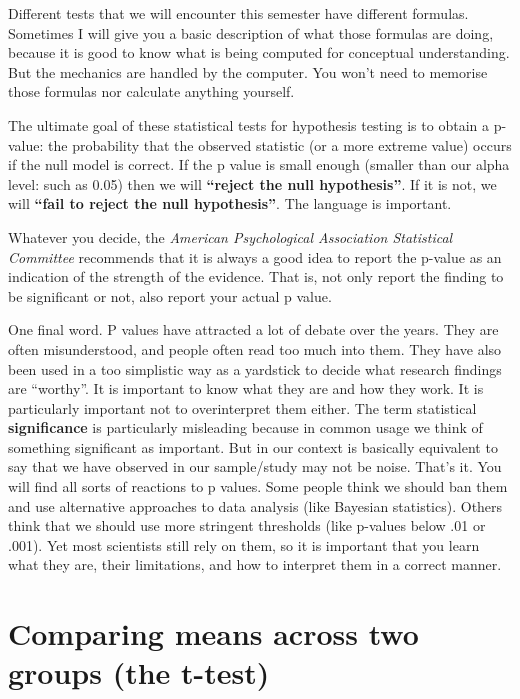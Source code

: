 \documentclass[
]{book}
\begin{document}
Different tests that we will encounter this semester have different formulas. Sometimes I will give you a basic description of what those formulas are doing, because it is good to know what is being computed for conceptual understanding. But the mechanics are handled by the computer. You won't need to memorise those formulas nor calculate anything yourself.

The ultimate goal of these statistical tests for hypothesis testing is to obtain a p-value: the probability that the observed statistic (or a more extreme value) occurs if the null model is correct. If the p value is small enough (smaller than our alpha level: such as 0.05) then we will \textbf{``reject the null hypothesis''}. If it is not, we will \textbf{``fail to reject the null hypothesis''}. The language is important.

Whatever you decide, the \emph{American Psychological Association Statistical Committee} recommends that it is always a good idea to report the p-value as an indication of the strength of the evidence. That is, not only report the finding to be significant or not, also report your actual p value.

One final word. P values have attracted a lot of debate over the years. They are often misunderstood, and people often read too much into them. They have also been used in a too simplistic way as a yardstick to decide what research findings are ``worthy''. It is important to know what they are and how they work. It is particularly important not to overinterpret them either. The term statistical \textbf{significance} is particularly misleading because in common usage we think of something significant as important. But in our context is basically equivalent to say that we have observed in our sample/study may not be noise. That's it. You will find all sorts of reactions to p values. Some people think we should ban them and use alternative approaches to data analysis (like Bayesian statistics). Others think that we should use more stringent thresholds (like p-values below .01 or .001). Yet most scientists still rely on them, so it is important that you learn what they are, their limitations, and how to interpret them in a correct manner.

\section{Comparing means across two groups (the t-test)}\label{comparing-means-across-two-groups-the-t-test}
\end{document}
